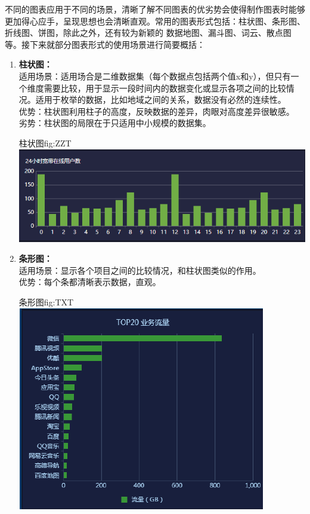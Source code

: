 \documentclass{HustGraduPaper}
\begin{document}
    不同的图表应用于不同的场景，清晰了解不同图表的优劣势会使得制作图表时能够更加得心应手，呈现思想也会清晰直观。常用的图表形式包括：柱状图、条形图、折线图、饼图，除此之外，还有较为新颖的
    数据地图、漏斗图、词云、散点图等。接下来就部分图表形式的使用场景进行简要概括：

    \begin{enumerate}
        \item {\bfseries 柱状图：\\}
        适用场景：适用场合是二维数据集（每个数据点包括两个值x和y），但只有一个维度需要比较，用于显示一段时间内的数据变化或显示各项之间的比较情况。适用于枚举的数据，比如地域之间的关系，数据没有必然的连续性。\\
        优势：柱状图利用柱子的高度，反映数据的差异，肉眼对高度差异很敏感。\\
        劣势：柱状图的局限在于只适用中小规模的数据集。
        \begin{generalfig}[htb]{柱状图}{fig:ZZT} 
            \includegraphics[width = \textwidth]{Figures/ZZT.png}
        \end{generalfig}
        \item {\bfseries 条形图：\\}
        适用场景：显示各个项目之间的比较情况，和柱状图类似的作用。\\
        优势：每个条都清晰表示数据，直观。\\
        \begin{generalfig}[htb]{条形图}{fig:TXT} 
            \includegraphics[scale = 1]{Figures/TXT.png}

\end{generalfig}
\end{enumerate}
\end{document}
